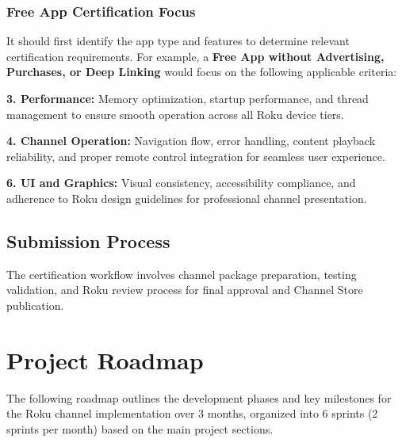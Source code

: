 \documentclass[11pt,letterpaper]{article}
\begin{document}
\subsubsection{Free App Certification Focus}
It should first identify the app type and features to determine relevant certification requirements. For example, a \textbf{Free App without Advertising, Purchases, or Deep Linking} would focus on the following applicable criteria:

\textbf{3. Performance:} Memory optimization, startup performance, and thread management to ensure smooth operation across all Roku device tiers.

\textbf{4. Channel Operation:} Navigation flow, error handling, content playback reliability, and proper remote control integration for seamless user experience.

\textbf{6. UI and Graphics:} Visual consistency, accessibility compliance, and adherence to Roku design guidelines for professional channel presentation.

\subsection{Submission Process}
The certification workflow involves channel package preparation, testing validation, and Roku review process for final approval and Channel Store publication.

\section{Project Roadmap}
\label{sec:roadmap}

The following roadmap outlines the development phases and key milestones for the Roku channel implementation over 3 months, organized into 6 sprints (2 sprints per month) based on the main project sections.
\end{document}
